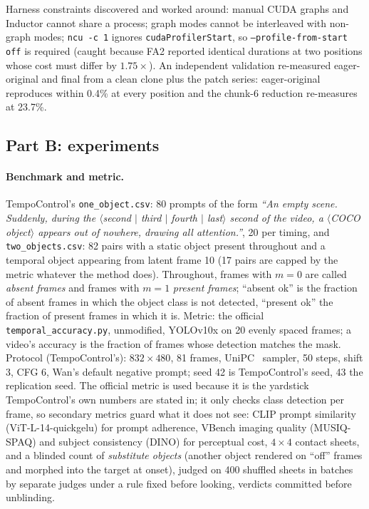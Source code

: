 \documentclass[10pt,a4paper]{article}
\begin{document}
Harness constraints discovered and worked around: manual CUDA graphs and Inductor cannot share a process; graph modes cannot be interleaved with non-graph modes; \texttt{ncu -c 1} ignores \texttt{cudaProfilerStart}, so \texttt{--profile-from-start off} is required (caught because FA2 reported identical durations at two positions whose cost must differ by $1.75\times$). An independent validation re-measured eager-original and final from a clean clone plus the patch series: eager-original reproduces within 0.4\% at every position and the chunk-6 reduction re-measures at 23.7\%.

\subsection{Part B: experiments}
\paragraph{Benchmark and metric.} TempoControl's \texttt{one\_object.csv}: 80 prompts of the form \emph{``An empty scene. Suddenly, during the $\langle$second $|$ third $|$ fourth $|$ last$\rangle$ second of the video, a $\langle$COCO object$\rangle$ appears out of nowhere, drawing all attention.''}, 20 per timing, and \texttt{two\_objects.csv}: 82 pairs with a static object present throughout and a temporal object appearing from latent frame 10 (17 pairs are capped by the metric whatever the method does). Throughout, frames with $m=0$ are called \emph{absent frames} and frames with $m=1$ \emph{present frames}; ``absent ok'' is the fraction of absent frames in which the object class is not detected, ``present ok'' the fraction of present frames in which it is. Metric: the official \texttt{temporal\_accuracy.py}, unmodified, YOLOv10x on 20 evenly spaced frames; a video's accuracy is the fraction of frames whose detection matches the mask. Protocol (TempoControl's): $832\times480$, 81 frames, UniPC~\cite{unipc} sampler, 50 steps, shift 3, CFG 6, Wan's default negative prompt; seed 42 is TempoControl's seed, 43 the replication seed. The official metric is used because it is the yardstick TempoControl's own numbers are stated in; it only checks class detection per frame, so secondary metrics guard what it does not see: CLIP prompt similarity (ViT-L-14-quickgelu) for prompt adherence, VBench imaging quality (MUSIQ-SPAQ) and subject consistency (DINO) for perceptual cost, $4\times4$ contact sheets, and a blinded count of \emph{substitute objects} (another object rendered on ``off'' frames and morphed into the target at onset), judged on 400 shuffled sheets in batches by separate judges under a rule fixed before looking, verdicts committed before unblinding.
\end{document}
